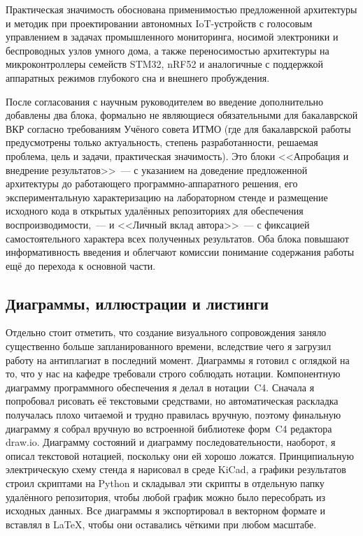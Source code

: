 Практическая значимость обоснована применимостью предложенной
архитектуры и методик при проектировании автономных
IoT-устройств с голосовым управлением в задачах промышленного
мониторинга, носимой электроники и беспроводных узлов умного
дома, а также переносимостью архитектуры на микроконтроллеры
семейств STM32, nRF52 и аналогичные с поддержкой аппаратных
режимов глубокого сна и внешнего пробуждения.

После согласования с научным руководителем во введение
дополнительно добавлены два блока, формально не являющиеся
обязательными для бакалаврской ВКР согласно требованиям Учёного
совета ИТМО (где для бакалаврской работы предусмотрены только
актуальность, степень разработанности, решаемая проблема, цель
и задачи, практическая значимость). Это блоки <<Апробация и
внедрение результатов>>~--- с указанием на доведение
предложенной архитектуры до работающего программно-аппаратного
решения, его экспериментальную характеризацию на лабораторном
стенде и размещение исходного кода в открытых удалённых
репозиториях для обеспечения воспроизводимости,~--- и <<Личный
вклад автора>>~--- с фиксацией самостоятельного характера всех
полученных результатов. Оба блока повышают информативность
введения и облегчают комиссии понимание содержания работы ещё
до перехода к основной части.

\subsection{Диаграммы, иллюстрации и листинги}

Отдельно стоит отметить, что создание визуального сопровождения заняло
существенно больше запланированного времени, вследствие чего я загрузил
работу на антиплагиат в последний момент. Диаграммы я готовил с оглядкой
на то, что у нас на кафедре требовали строго соблюдать нотации.
Компонентную диаграмму программного обеспечения я делал в нотации~C4.
Сначала я попробовал рисовать её текстовыми средствами, но
автоматическая раскладка получалась плохо читаемой и трудно правилась
вручную, поэтому финальную диаграмму я собрал вручную во встроенной
библиотеке форм~C4 редактора draw.io. Диаграмму состояний и диаграмму
последовательности, наоборот, я описал текстовой нотацией, поскольку
они ей хорошо ложатся. Принципиальную электрическую схему стенда я
нарисовал в среде KiCad, а графики результатов строил скриптами на
Python и складывал эти скрипты в отдельную папку удалённого репозитория,
чтобы любой график можно было пересобрать из исходных данных. Все
диаграммы я экспортировал в векторном формате и вставлял в \LaTeX{},
чтобы они оставались чёткими при любом масштабе.

